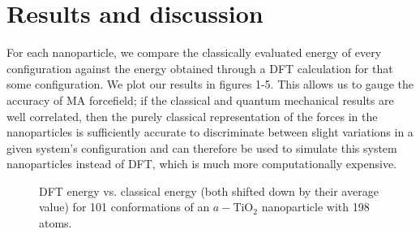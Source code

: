 \documentclass[aps,prb,twocolumn,amsmath,amssymb,superscriptaddress,longbibliography]{revtex4-1}
\newcommand\tab[1][1cm]{\hspace*{#1}} %
\begin{document}

\section*{Results and discussion}

\tab For each nanoparticle, we compare the classically evaluated energy of every configuration against the energy obtained through a DFT calculation for that some configuration. 
We plot our results in figures 1-5.
This allows us to gauge the accuracy of MA forcefield; if the classical and quantum mechanical results are well correlated, then the purely classical representation of the forces in the nanoparticles is sufficiently accurate to discriminate between slight variations in a given system's configuration and can therefore be used to simulate this system nanoparticles instead of DFT, which is much more computationally expensive.


\begin{figure}[htb]
\caption{DFT energy vs. classical energy (both shifted down by their average value) for 101 conformations of an $a-\text{TiO}_2$ nanoparticle with 198 atoms.}
\label{nnp_198}
\end{figure}
\end{document}
